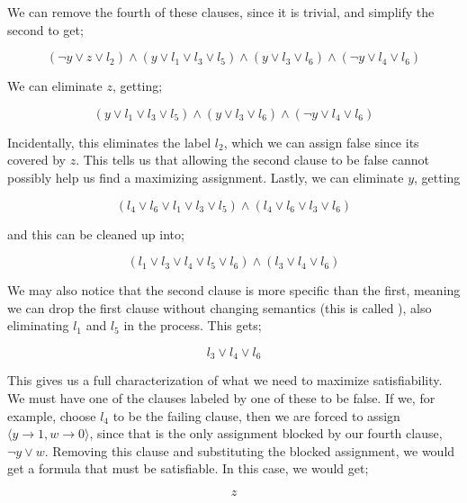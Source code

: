 We can remove the fourth of these clauses, since it is trivial, and simplify the second to get;

\begin{equation}
(\neg y\lor z\lor l_2)\land (y\lor l_1 \lor l_3\lor l_5)\land (y\lor l_3\lor l_6) \land (\neg y\lor l_4\lor l_6)
\end{equation}

We can eliminate $z$, getting;

\begin{equation}
(y\lor l_1 \lor l_3\lor l_5)\land (y\lor l_3\lor l_6) \land (\neg y\lor l_4\lor l_6)
\end{equation}

Incidentally, this eliminates the label $l_2$, which we can assign false since its covered by $z$. This tells us that allowing the second clause to be false cannot possibly help us find a maximizing assignment. Lastly, we can eliminate $y$, getting

\begin{equation}
    (l_4 \lor l_6\lor l_1\lor l_3\lor l_5)\land (l_4\lor l_6\lor l_3\lor l_6)
\end{equation}

and this can be cleaned up into;

\begin{equation}
    (l_1 \lor l_3\lor l_4\lor l_5\lor l_6)\land (l_3 \lor l_4\lor l_6)
\end{equation}

We may also notice that the second clause is more specific than the first, meaning we can drop the first clause without changing semantics (this is called ), also eliminating $l_1$ and $l_5$ in the process. This gets;

\begin{equation}
    l_3 \lor l_4\lor l_6
\end{equation}

This gives us a full characterization of what we need to maximize satisfiability. We must have one of the clauses labeled by one of these to be false. If we, for example, choose $l_4$ to be the failing clause, then we are forced to assign $\langle y \rightarrow 1, w \rightarrow 0\rangle$, since that is the only assignment blocked by our fourth clause, $\neg y \vee w$. Removing this clause and substituting the blocked assignment, we would get a formula that must be satisfiable. In this case, we would get;

\begin{equation}
    z
\end{equation}

